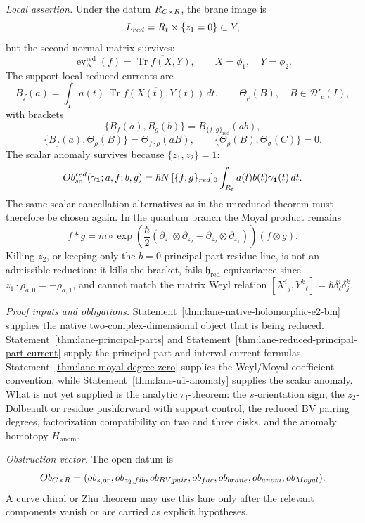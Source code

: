 \begin{stmt}
  \emph{Local assertion.} Under the datum
  \(R_{C\times R}\), the brane image is
  \[
    L_{red}=R_t\times\{z_1=0\}\subset Y,
  \]
  but the second normal matrix survives:
  \[
    \operatorname{ev}^{\mathrm{red}}_N(f)
    =
    \overline{\operatorname{Tr}f(X,Y)},\qquad
    X=\phi_1,\quad Y=\phi_2.
  \]
  The support-local reduced currents are
  \[
    B_f(a)=\int_I a(t)\,
    \overline{\operatorname{Tr}f(X(t),Y(t))}\,dt,
    \qquad
    \Theta_\rho(B),\quad B\in\mathcal D'_c(I),
  \]
  with brackets
  \[
    \{B_f(a),B_g(b)\}
      =B_{\{f,g\}_{\mathrm{red}}}(ab),
  \]
  \[
    \{B_f(a),\Theta_\rho(B)\}
      =
      \Theta_{f\cdot\rho}(aB),
    \qquad
    \{\Theta_\rho(B),\Theta_\sigma(C)\}=0 .
  \]
  The scalar anomaly survives because \(\{z_1,z_2\}=1\):
  \[
    Ob^{red}_{sc}
    (\gamma_{\mathbf1};a,f;b,g)
    =
    \hbar N\, [\{f,g\}_{red}]_0
    \int_{R_t}a(t)b(t)\gamma_{\mathbf1}(t)\,dt .
  \]
  The same scalar-cancellation alternatives as in the unreduced theorem
  must therefore be chosen again.  In the quantum branch the Moyal
  product remains
  \[
    f*g
    =
    m\circ\exp\!\left(
      \frac{\hbar}{2}
      (\partial_{z_1}\otimes\partial_{z_2}
      -\partial_{z_2}\otimes\partial_{z_1})
    \right)(f\otimes g).
  \]
  Killing \(z_2\), or keeping only the \(b=0\) principal-part residue
  line, is not an admissible reduction: it kills the bracket, fails
  \(\mathfrak h_{\mathrm{red}}\)-equivariance since
  \(z_1\cdot\rho_{a,0}=-\rho_{a,1}\), and cannot match the matrix Weyl
  relation \([X^i{}_j,Y^k{}_\ell]=\hbar\delta^i_\ell\delta^k_j\).

  \emph{Proof inputs and obligations.}
  Statement~\ref{thm:lane-native-holomorphic-e2-bm} supplies the native
  two-complex-dimensional object that is being reduced.
  Statement~\ref{thm:lane-principal-parts} and
  Statement~\ref{thm:lane-reduced-principal-part-current} supply the
  principal-part and interval-current formulas.
  Statement~\ref{thm:lane-moyal-degree-zero} supplies the Weyl/Moyal
  coefficient convention, while Statement~\ref{thm:lane-u1-anomaly}
  supplies the scalar anomaly.  What is not yet supplied is the analytic
  \(\pi_!\)-theorem: the \(s\)-orientation sign, the \(z_2\)-Dolbeault
  or residue pushforward with support control, the reduced BV pairing
  degrees, factorization compatibility on two and three disks, and the
  anomaly homotopy \(H_{\mathrm{anom}}\).

  \emph{Obstruction vector.} The open datum is
  \[
    Ob_{C\times R}
    =
    (ob_{s,or},
     ob_{z_2,fib},
     ob_{BV,pair},
     ob_{fac},
     ob_{brane},
     ob_{anom},
     ob_{Moyal}).
  \]
  A curve chiral or Zhu theorem may use this lane only after the relevant
  components vanish or are carried as explicit hypotheses.
\end{stmt}

